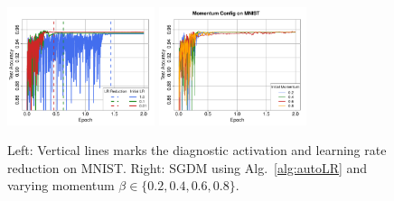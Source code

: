 \documentclass[conference]{IEEEtran}
\begin{document}
\begin{figure}[h!]
\begin{center}
  \includegraphics[width=1.7in]{fig/RFig1_LR_notitle.pdf}
\includegraphics[width=1.7in]{fig/RFig2_AltMom.pdf}
\end{center}
\vspace{-0.16in}
  \caption{Left: Vertical lines marks the diagnostic activation and learning rate reduction on MNIST.
  Right: SGDM using Alg.~\ref{alg:autoLR} and varying momentum $\beta\in\{0.2, 0.4, 0.6, 0.8\}$.
  }
\label{fig:mnistactivate_momvary}\vspace{-0.12in}
\end{figure}
\end{document}
